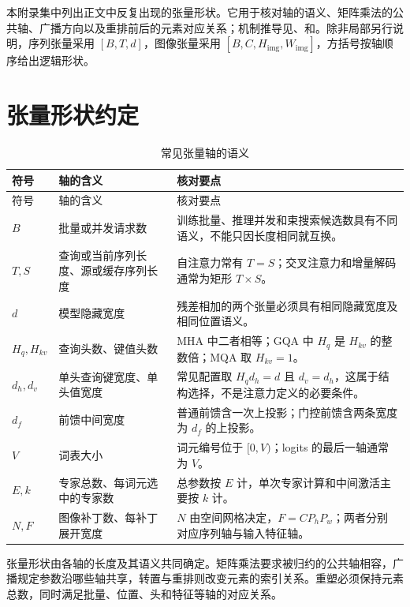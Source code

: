 \documentclass[../textbook.tex]{subfiles}
\begin{document}
\fi
{}

本附录集中列出正文中反复出现的张量形状。它用于核对轴的语义、矩阵乘法的公共轴、广播方向以及重排前后的元素对应关系；机制推导见、和。除非局部另行说明，序列张量采用 $[B,T,d]$，图像张量采用 $[B,C,H_{\mathrm{img}},W_{\mathrm{img}}]$，方括号按轴顺序给出逻辑形状。

\section{张量形状约定}

\begin{longtable}{@{}p{.15\linewidth}p{.29\linewidth}p{.47\linewidth}@{}}
\caption{常见张量轴的语义}\label{tab:appendix-shape-axes}\\
\toprule
符号 & 轴的含义 & 核对要点\\\midrule
\endfirsthead
\toprule
符号 & 轴的含义 & 核对要点\\\midrule
\endhead
$B$ & 批量或并发请求数 & 训练批量、推理并发和束搜索候选数具有不同语义，不能只因长度相同就互换。\\
$T,S$ & 查询或当前序列长度、源或缓存序列长度 & 自注意力常有 $T=S$；交叉注意力和增量解码通常为矩形 $T\times S$。\\
$d$ & 模型隐藏宽度 & 残差相加的两个张量必须具有相同隐藏宽度及相同位置语义。\\
$H_q,H_{kv}$ & 查询头数、键值头数 & MHA 中二者相等；GQA 中 $H_q$ 是 $H_{kv}$ 的整数倍；MQA 取 $H_{kv}=1$。\\
$d_h,d_v$ & 单头查询键宽度、单头值宽度 & 常见配置取 $H_qd_h=d$ 且 $d_v=d_h$，这属于结构选择，不是注意力定义的必要条件。\\
$d_f$ & 前馈中间宽度 & 普通前馈含一次上投影；门控前馈含两条宽度为 $d_f$ 的上投影。\\
$V$ & 词表大小 & 词元编号位于 $[0,V)$；logits 的最后一轴通常为 $V$。\\
$E,k$ & 专家总数、每词元选中的专家数 & 总参数按 $E$ 计，单次专家计算和中间激活主要按 $k$ 计。\\
$N,F$ & 图像补丁数、每补丁展开宽度 & $N$ 由空间网格决定，$F=C P_hP_w$；两者分别对应序列轴与输入特征轴。\\
\bottomrule
\end{longtable}

张量形状由各轴的长度及其语义共同确定。矩阵乘法要求被归约的公共轴相容，广播规定参数沿哪些轴共享，转置与重排则改变元素的索引关系。重塑必须保持元素总数，同时满足批量、位置、头和特征等轴的对应关系。
\end{document}

